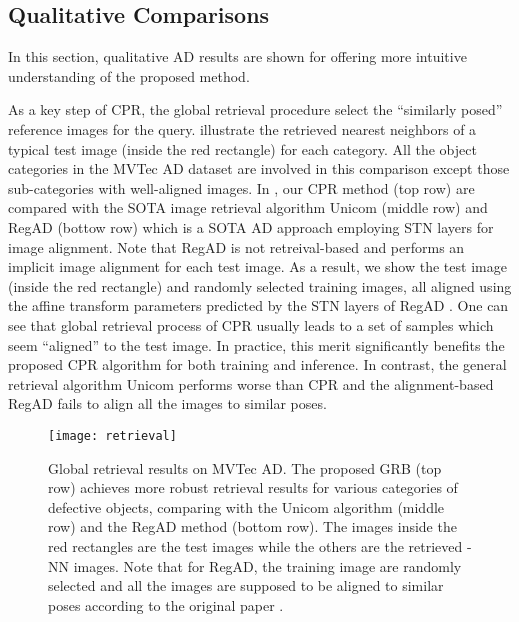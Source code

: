 \documentclass[lettersize,journal]{IEEEtran}
\begin{document}
\subsection{Qualitative Comparisons}
\label{subsec:qualitative}

In this section, qualitative AD results are shown for offering more intuitive
understanding of the proposed method.

As a key step of CPR, the global retrieval procedure
select the ``similarly posed'' reference images for the query. 
illustrate the retrieved  nearest neighbors of a typical test image (inside the red rectangle) for each category.
All the object categories in the MVTec AD dataset \cite{Bergmann_2019_CVPR} are involved in this comparison except those sub-categories with well-aligned images.
In , our CPR method (top row) are compared with the SOTA image retrieval algorithm Unicom \cite{an2023unicom} (middle row) and RegAD \cite{huang2022registration} (bottow row) which is a SOTA AD approach employing STN layers for image alignment.
Note that RegAD is not retreival-based and performs an implicit image alignment for each test image. As a result, we show the test image (inside the red rectangle) and  randomly selected training images, all aligned using the affine transform parameters predicted by the STN layers of RegAD \cite{huang2022registration}.
One can see that global retrieval process of CPR usually leads to a set of
samples which seem ``aligned'' to the test image. In practice, this merit significantly benefits the proposed CPR algorithm for both training and inference. In contrast, the general retrieval algorithm Unicom \cite{Bergmann_2019_CVPR} performs worse than CPR and the alignment-based RegAD \cite{huang2022registration} fails to align all the images to similar poses.

\begin{figure*}[htbp]
  \centering
  \texttt{[image: retrieval]}
  \caption{
    Global retrieval results on MVTec AD. The proposed GRB (top row) achieves more robust
    retrieval results for various categories of defective objects, comparing with the Unicom
    algorithm \cite{an2023unicom} (middle row) and the RegAD method \cite{huang2022registration} (bottom row).
    The images inside the red rectangles are the test images while the others are the retrieved -NN images.
    Note that for RegAD, the  training image are randomly selected and all the  images are supposed to be aligned to similar poses according to the original paper \cite{huang2022registration}.
  }
  \label{fig:retrieval}
\end{figure*}
\end{document}
